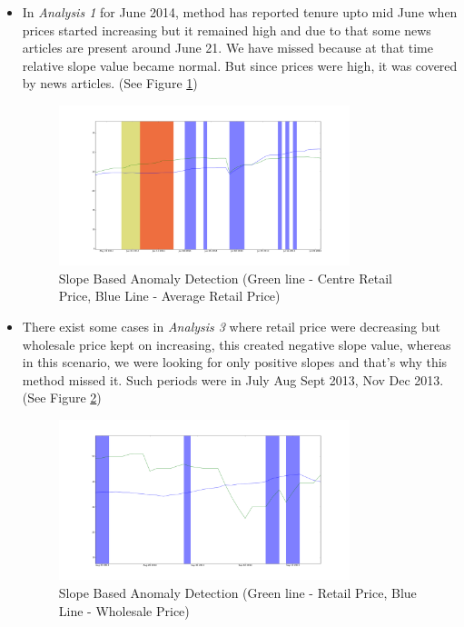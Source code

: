 \begin{itemize}
			\item In \textit{Analysis 1} for June 2014, method has reported tenure upto mid June when prices started increasing but it remained high and due to that some news articles are present around June 21. We have missed because at that time relative slope value became normal. But since prices were high, it was covered by news articles. (See Figure \ref{fig:12116})
			
			\begin{figure}[H]
		    	\centering
  		    	\includegraphics[width=0.8\textwidth]{graphs/12116.png}
		    	\caption{Slope Based Anomaly Detection (Green line - Centre Retail Price, Blue Line - Average Retail Price)}
		    	\label{fig:12116}
			\end{figure}			
			
			
			\item There exist some cases in \textit{Analysis 3} where retail price were decreasing but wholesale price kept on increasing, this created negative slope value, whereas in this scenario, we were looking for only positive slopes and that's why this method missed it. Such periods were in July Aug Sept 2013, Nov Dec 2013. (See Figure \ref{fig:12134})
			
			\begin{figure}[H]
		    	\centering
  		    	\includegraphics[width=0.8\textwidth]{graphs/12134.png}
		    	\caption{Slope Based Anomaly Detection (Green line - Retail Price, Blue Line - Wholesale Price)}
		    	\label{fig:12134}
			\end{figure}			
			
		\end{itemize}
		
